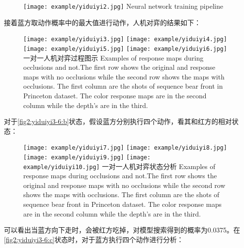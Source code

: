 \begin{figure}[!hbtp]
	\centering
	\texttt{[image: example/yiduiyi2.jpg]}
	{Neural network training pipeline}
	\label{yiduiyi2.jpg}
\end{figure}

接着蓝方取动作概率中的最大值进行动作，人机对弈的结果如下：


\begin{figure}[!htp]
	\centering
	\subcaptionbox{\label{fig2:yiduiyi3-6:a}}
	{\texttt{[image: example/yiduiyi3.jpg]}}
	\hspace{0.5em}
	\subcaptionbox{\label{fig2:yiduiyi3-6:b}}
	{\texttt{[image: example/yiduiyi4.jpg]}}
	\newline
	\centering
	\subcaptionbox{\label{fig2:yiduiyi3-6:c}}
	{\texttt{[image: example/yiduiyi5.jpg]}}
	\hspace{0.5em}
	\subcaptionbox{\label{fig2:yiduiyi3-6:d}}
	{\texttt{[image: example/yiduiyi6.jpg]}}
	\bicaption
	{一对一人机对弈过程图示}
	{Examples of response maps during occlusions and not.The first row shows the original and response maps with no occlusions while the second row shows the maps with occlusions. The first column are the shots of sequence bear front in Princeton dataset. The color response maps are in the second column while the depth’s are in the third.}
	\label{fig2:yiduiyi3-6}
\end{figure}

对于\ref{fig2:yiduiyi3-6:b}状态，假设蓝方分别执行四个动作，看其和红方的相对状态：
\begin{figure}[!htp]
	\centering
	{\texttt{[image: example/yiduiyi7.jpg]}}
	\hspace{0.5em}
	{\texttt{[image: example/yiduiyi8.jpg]}}
	\newline
	\centering
	{\texttt{[image: example/yiduiyi9.jpg]}}
	\hspace{0.5em}
	{\texttt{[image: example/yiduiyi10.jpg]}}
	\bicaption
	{一对一人机对弈状态分析}
	{Examples of response maps during occlusions and not.The first row shows the original and response maps with no occlusions while the second row shows the maps with occlusions. The first column are the shots of sequence bear front in Princeton dataset. The color response maps are in the second column while the depth’s are in the third.}
	\label{fig2:yiduiyi7-10}
\end{figure}
可以看出当蓝方向下走时，会被红方吃掉，对模型搜索得到的概率为0.0375。在\ref{fig2:yiduiyi3-6:c}状态时，对于蓝方执行四个动作进行分析：

